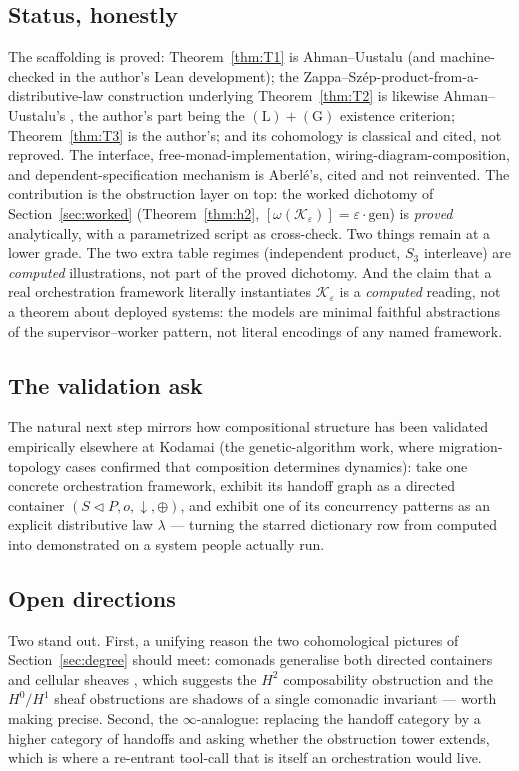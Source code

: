 \documentclass[11pt]{amsart}
\theoremstyle{definition}
\theoremstyle{remark}
\newcommand{\K}{\mathcal{K}}
\newcommand{\seq}{\triangleleft}
\begin{document}
\subsection*{Status, honestly}
The scaffolding is proved: Theorem~\ref{thm:T1} is Ahman--Uustalu (and machine-checked in the
author's Lean development); the Zappa--Sz\'ep-product-from-a-distributive-law construction
underlying Theorem~\ref{thm:T2} is likewise Ahman--Uustalu's \cite{AhmanUustaluDL}, the
author's part being the $\mathrm{(L)}+\mathrm{(G)}$ existence criterion; Theorem~\ref{thm:T3}
is the author's; and its cohomology is classical and cited, not reproved. The interface,
free-monad-implementation, wiring-diagram-composition, and dependent-specification mechanism is
Aberl\'e's, cited and not reinvented. The contribution is the obstruction layer on top: the
worked dichotomy of Section~\ref{sec:worked} (Theorem~\ref{thm:h2}, $[\omega(\K_\varepsilon)]=
\varepsilon\cdot\text{gen}$) is \emph{proved} analytically, with a parametrized script as
cross-check. Two things remain at a lower grade. The two extra table regimes (independent
product, $S_3$ interleave) are \emph{computed} illustrations, not part of the proved dichotomy.
And the claim that a real orchestration framework literally instantiates $\K_\varepsilon$ is a
\emph{computed} reading, not a theorem about deployed systems: the models are minimal faithful
abstractions of the supervisor--worker pattern, not literal encodings of any named framework.

\subsection*{The validation ask}
The natural next step mirrors how compositional structure has been validated empirically
elsewhere at Kodamai (the genetic-algorithm work, where migration-topology cases confirmed that
composition determines dynamics): take one concrete orchestration framework, exhibit its
handoff graph as a directed container $(S\seq P,o,\downarrow,\oplus)$, and exhibit one of its
concurrency patterns as an explicit distributive law $\lambda$ --- turning the starred
dictionary row from computed into demonstrated on a system people actually run.

\subsection*{Open directions}
Two stand out. First, a unifying reason the two cohomological pictures of
Section~\ref{sec:degree} should meet: comonads generalise both directed containers and
cellular sheaves \cite{comonadsspaces}, which suggests the $H^2$ composability obstruction and
the $H^0/H^1$ sheaf obstructions are shadows of a single comonadic invariant --- worth making
precise. Second, the $\infty$-analogue: replacing the handoff category by a higher category of
handoffs and asking whether the obstruction tower extends, which is where a re-entrant tool-call
that is itself an orchestration would live.
\end{document}
